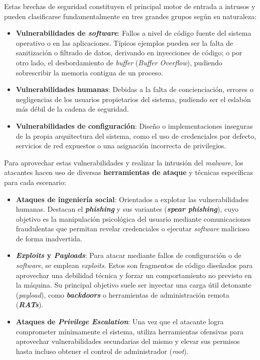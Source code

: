 Estas brechas de seguridad constituyen el principal motor de entrada a intrusos y pueden clasificarse fundamentalmente en tres grandes grupos según su naturaleza:
\begin{itemize}
    \item \textbf{Vulnerabilidades de \textit{software}}: Fallos a nivel de código fuente del sistema operativo o en las aplicaciones.
    Típicos ejemplos pueden ser la falta de sanitización o filtrado de datos, derivando en inyecciones de código; o por otro lado, el desbordamiento de \textit{buffer} (\textit{Buffer Overflow}), pudiendo sobrescribir la memoria contigua de un proceso.
    \item \textbf{Vulnerabilidades humanas}: Debidas a la falta de concienciación, errores o negligencias de los usuarios propietarios del sistema, pudiendo ser el eslabón más débil de la cadena de seguridad.
    \item \textbf{Vulnerabilidades de configuración}: Diseño o implementaciones inseguras de la propia arquitectura del sistema, como el uso de credenciales por defecto, servicios de red expuestos o una asignación incorrecta de privilegios.
\end{itemize}

Para aprovechar estas vulnerabilidades y realizar la intrusión del \textit{malware}, los atacantes hacen uso de diversas \textbf{herramientas de ataque} y técnicas específicas para cada escenario:
\begin{itemize}
    \item \textbf{Ataques de ingeniería social}: Orientados a explotar las vulnerabilidades humanas. Destacan el \textbf{\textit{phishing}} y sus variantes (\textbf{\textit{spear phishing}}),
    cuyo objetivo es la manipulación psicológica del usuario mediante comunicaciones fraudulentas que permitan revelar credenciales o ejecutar \textit{software} malicioso de forma inadvertida.
    \item \textbf{\textit{Exploits} y \textit{Payloads}}: Para atacar mediante fallos de configuración o de \textit{software}, se emplean \textit{exploits}.
    Estos son fragmentos de código diseñados para aprovechar una debilidad técnica y forzar un comportamiento no previsto en la máquina.
    Su principal objetivo suele ser inyectar una carga útil detonante (\textit{payload}), como \textbf{\textit{backdoors}} o herramientas de administración remota (\textbf{\textit{RATs}}).
    \item \textbf{Ataques de \textit{Privilege Escalation}}: Una vez que el atacante logra comprometer mínimamente el sistema,
    utiliza herramientas ofensivas para aprovechar vulnerabilidades secundarias del mismo y elevar sus permisos hasta incluso obtener el control de administrador (\textit{root}).
\end{itemize}

